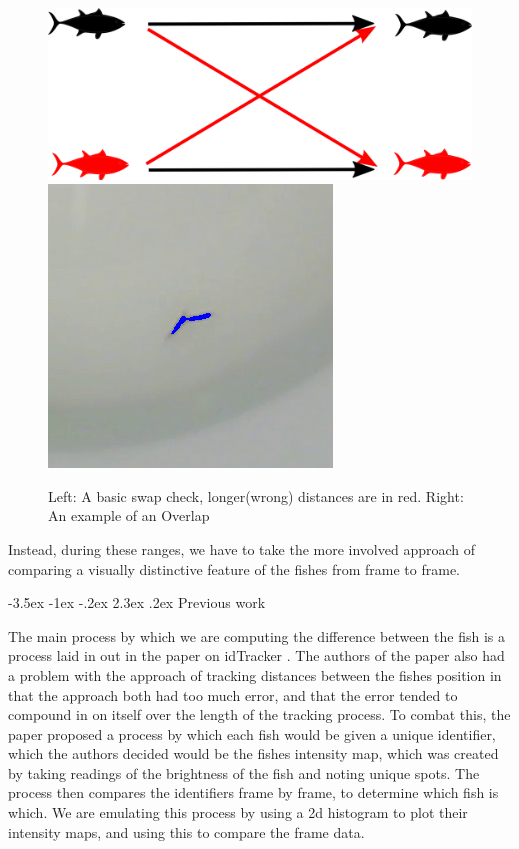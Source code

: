 \documentclass{article}
\makeatletter
\renewcommand\section{\clearpage\newpage\@startsection {section}{1}{\z@}%
	{-3.5ex \@plus -1ex \@minus -.2ex}%
	{2.3ex \@plus.2ex}%
	{\normalfont\Large\bfseries}}
\makeatother
\begin{document}
\begin{figure}[H]
	\centering
	\newlength{\mylen}
	\setlength{\mylen}{.4\linewidth}
	\includegraphics[width=.5\linewidth]{fish1}
	\hspace{.02\linewidth}
	\includegraphics[height=\mylen]{overlapzoom}
	\caption{Left: A basic swap check, longer(wrong) distances are in red. Right: An example of an Overlap}
	\label{fig:overlap_swap}
\end{figure}

Instead, during these ranges, we have to take the more involved approach of comparing a visually distinctive feature of the fishes from frame to frame.

\section{Previous work}

The main process by which we are computing the difference between the fish is a process laid in out in the paper on idTracker \cite{idTracker}. The authors of the paper also had a problem with the approach of tracking distances between the fishes position in that the approach both had too much error, and that the error tended to compound in on itself over the length of the tracking process. To combat this, the paper proposed a process by which each fish would be given a unique identifier, which the authors decided would be the fishes intensity map, which was created by taking readings of the brightness of the fish and noting unique spots. The process then compares the identifiers frame by frame, to determine which fish is which. We are emulating this process by using a 2d histogram to plot their intensity maps, and using this to compare the frame data.
\end{document}
